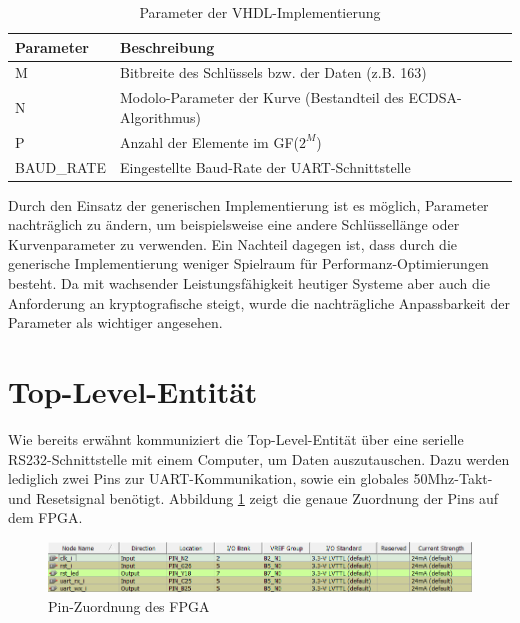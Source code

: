 \begin{table} [h]
	\centering 
	\begin{tabular}{ | p{3cm} | p{12cm} | }
		\hline
		\textbf{Parameter} & \textbf{Beschreibung}\\
		\hline
		M & Bitbreite des Schlüssels bzw. der Daten (z.B. 163) \\
		\hline
		N & Modolo-Parameter der Kurve (Bestandteil des ECDSA-Algorithmus) \\
		\hline
		P & Anzahl der Elemente im GF($2^M$) \\
		\hline
		BAUD\_RATE & Eingestellte Baud-Rate der UART-Schnittstelle \\
		\hline
	\end{tabular}
	\caption{Parameter der VHDL-Implementierung}
	\label{tab:vhdl-impl-param}
\end{table}

Durch den Einsatz der generischen Implementierung ist es möglich, Parameter nachträglich zu ändern, um beispielsweise eine andere Schlüssellänge oder Kurvenparameter zu verwenden. Ein Nachteil dagegen ist, dass durch die generische Implementierung weniger Spielraum für Performanz-Optimierungen besteht. Da mit wachsender Leistungsfähigkeit heutiger Systeme aber auch die Anforderung an kryptografische steigt, wurde die nachträgliche Anpassbarkeit der Parameter als wichtiger angesehen.



\section{Top-Level-Entität}
\label{vhdl-impl-tld}

Wie bereits erwähnt kommuniziert die Top-Level-Entität über eine serielle RS232-Schnittstelle mit einem Computer, um Daten auszutauschen. Dazu werden lediglich zwei Pins zur UART-Kommunikation, sowie ein globales 50Mhz-Takt- und Resetsignal benötigt. Abbildung \ref{fig:pins} zeigt die genaue Zuordnung der Pins auf dem FPGA. 

\begin{figure}[H]
	\centering
	\includegraphics[width=\textwidth]{bilder/pins}
	\caption{Pin-Zuordnung des FPGA}
	\label{fig:pins}
\end{figure}

